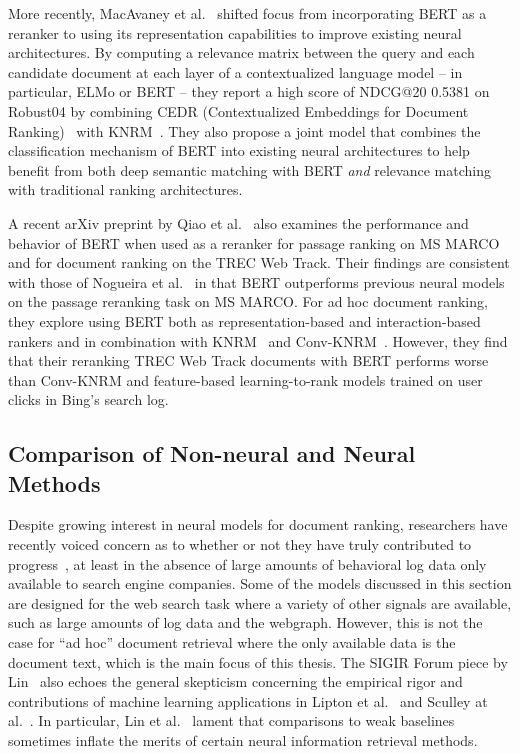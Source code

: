 More recently, MacAvaney et al.~\cite{macavaney2019cedr} shifted focus from incorporating BERT as a reranker to using its representation capabilities to improve existing neural architectures.
By computing a relevance matrix between the query and each candidate document at each layer of a contextualized language model -- in particular, ELMo or BERT --  they report a high score of NDCG@20 0.5381 on Robust04 by combining CEDR (Contextualized Embeddings for Document Ranking)~\cite{macavaney2019cedr} with KNRM~\cite{xiong2017knrm}.
They also propose a joint model that combines the classification mechanism of BERT into existing neural architectures to help benefit from both deep semantic matching with BERT \textit{and} relevance matching with traditional ranking architectures.

A recent arXiv preprint by Qiao et al.~\cite{Qiao:1904.07531:2019} also examines the performance and behavior of BERT when used as a reranker for passage ranking on MS MARCO and for document ranking on the TREC Web Track.
Their findings are consistent with those of Nogueira et al.~\cite{nogueira2019passage} in that BERT outperforms previous neural models on the passage reranking task on MS MARCO.
For ad hoc document ranking, they explore using BERT both as representation-based and interaction-based rankers and in combination with KNRM~\cite{xiong2017knrm} and Conv-KNRM~\cite{dai2018convolutional}.
However, they find that their reranking TREC Web Track documents with BERT performs worse than Conv-KNRM and feature-based learning-to-rank models trained on user clicks in Bing's search log.

\subsection{Comparison of Non-neural and Neural Methods}

Despite growing interest in neural models for document ranking, researchers have recently voiced concern as to whether or not they have truly contributed to progress~\cite{lin2019neural}, at least in the absence of large amounts of behavioral log data only available to search engine companies.
Some of the models discussed in this section are designed for the web search task where a variety of other signals are available, such as large amounts of log data and the webgraph.
However, this is not the case for ``ad hoc'' document retrieval where the only available data is the document text, which is the main focus of this thesis.
The SIGIR Forum piece by Lin~\cite{lin2019neural} also echoes the general skepticism concerning the empirical rigor and contributions of machine learning applications in Lipton et al.~\cite{lipton2018troubling} and Sculley at al.~\cite{sculley2018winner}.
In particular, Lin et al.~\cite{lin2019neural} lament that comparisons to weak baselines sometimes inflate the merits of certain neural information retrieval methods.

